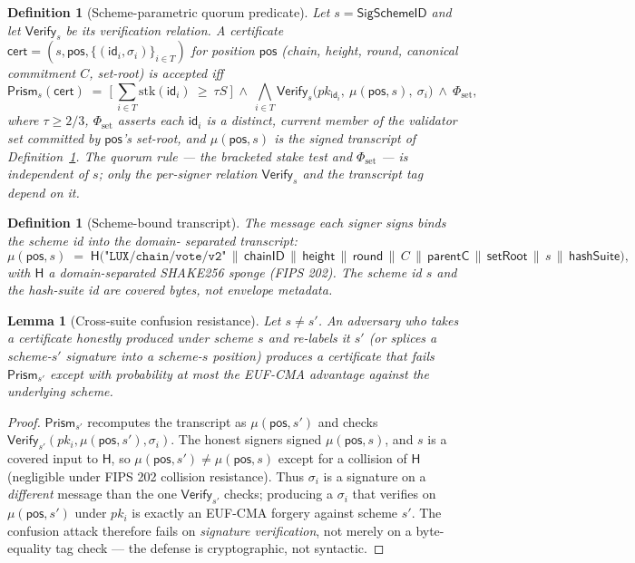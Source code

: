 \documentclass[11pt]{article}
\newtheorem{lemma}[theorem]{Lemma}
\newtheorem{definition}[theorem]{Definition}
\begin{document}
\begin{definition}[Scheme-parametric quorum predicate]
\label{def:scheme-predicate}
Let $s = \mathsf{SigSchemeID}$ and let $\mathsf{Verify}_s$ be its
verification relation. A certificate
$\mathsf{cert} = (s, \mathsf{pos}, \{(\mathsf{id}_i, \sigma_i)\}_{i\in T})$
for position $\mathsf{pos}$ (chain, height, round, canonical commitment
$C$, set-root) is accepted iff
\[
  \mathsf{Prism}_s(\mathsf{cert}) \;=\;
  \Big[\ \textstyle\sum_{i\in T}\mathrm{stk}(\mathsf{id}_i)\ \ge\ \tau S\ \Big]
  \ \wedge\
  \bigwedge_{i\in T}\mathsf{Verify}_s\!\big(pk_{\mathsf{id}_i},\ \mu(\mathsf{pos},s),\ \sigma_i\big)
  \ \wedge\ \Phi_{\mathrm{set}},
\]
where $\tau \ge 2/3$, $\Phi_{\mathrm{set}}$ asserts each $\mathsf{id}_i$
is a distinct, current member of the validator set committed by
$\mathsf{pos}$'s set-root, and $\mu(\mathsf{pos},s)$ is the signed
transcript of Definition~\ref{def:transcript-binding}. The
\emph{quorum rule} --- the bracketed stake test and $\Phi_{\mathrm{set}}$
--- is independent of $s$; only the per-signer relation
$\mathsf{Verify}_s$ and the transcript tag depend on it.
\end{definition}

\begin{definition}[Scheme-bound transcript]
\label{def:transcript-binding}
The message each signer signs binds the scheme id into the domain-
separated transcript:
\[
  \mu(\mathsf{pos}, s) \;=\;
  \mathsf{H}\big(\texttt{"LUX/chain/vote/v2"} \,\|\, \mathsf{chainID}
    \,\|\, \mathsf{height} \,\|\, \mathsf{round} \,\|\, C
    \,\|\, \mathsf{parentC} \,\|\, \mathsf{setRoot}
    \,\|\, s \,\|\, \mathsf{hashSuite}\big),
\]
with $\mathsf{H}$ a domain-separated SHAKE256 sponge (FIPS 202). The
scheme id $s$ and the hash-suite id are covered bytes, not envelope
metadata.
\end{definition}

\begin{lemma}[Cross-suite confusion resistance]
\label{lem:cross-suite}
Let $s \ne s'$. An adversary who takes a certificate honestly produced
under scheme $s$ and re-labels it $s'$ (or splices a scheme-$s'$
signature into a scheme-$s$ position) produces a certificate that fails
$\mathsf{Prism}_{s'}$ except with probability at most the EUF-CMA
advantage against the underlying scheme.
\end{lemma}
\begin{proof}
$\mathsf{Prism}_{s'}$ recomputes the transcript as $\mu(\mathsf{pos}, s')$
and checks $\mathsf{Verify}_{s'}(pk_i, \mu(\mathsf{pos}, s'), \sigma_i)$.
The honest signers signed $\mu(\mathsf{pos}, s)$, and $s$ is a covered
input to $\mathsf{H}$, so $\mu(\mathsf{pos}, s') \ne \mu(\mathsf{pos}, s)$
except for a collision of $\mathsf{H}$ (negligible under FIPS 202
collision resistance). Thus $\sigma_i$ is a signature on a
\emph{different} message than the one $\mathsf{Verify}_{s'}$ checks;
producing a $\sigma_i$ that verifies on $\mu(\mathsf{pos}, s')$ under
$pk_i$ is exactly an EUF-CMA forgery against scheme $s'$. The confusion
attack therefore fails on \emph{signature verification}, not merely on a
byte-equality tag check --- the defense is cryptographic, not
syntactic.
\end{proof}
\end{document}
